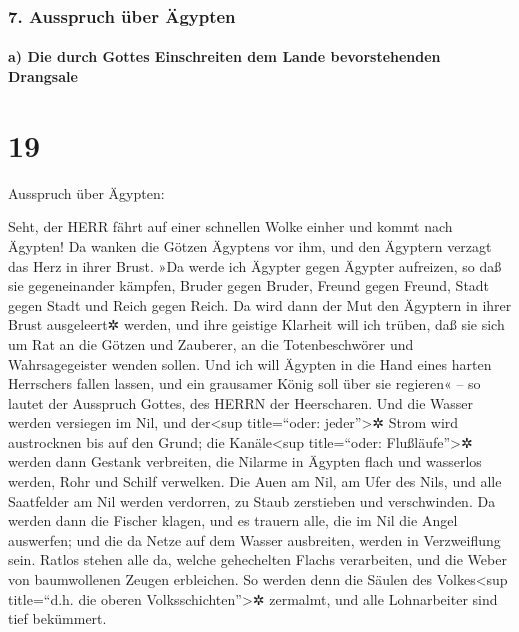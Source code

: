 \hypertarget{ausspruch-uxfcber-uxe4gypten}{%
\subsubsection{7. Ausspruch über
Ägypten}\label{ausspruch-uxfcber-uxe4gypten}}

\hypertarget{a-die-durch-gottes-einschreiten-dem-lande-bevorstehenden-drangsale}{%
\paragraph{a) Die durch Gottes Einschreiten dem Lande bevorstehenden
Drangsale}\label{a-die-durch-gottes-einschreiten-dem-lande-bevorstehenden-drangsale}}

\hypertarget{section-18}{%
\section{19}\label{section-18}}

Ausspruch über Ägypten:

Seht, der HERR fährt auf einer schnellen Wolke einher und kommt nach
Ägypten! Da wanken die Götzen Ägyptens vor ihm, und den Ägyptern verzagt
das Herz in ihrer Brust. »Da werde ich Ägypter gegen
Ägypter aufreizen, so daß sie gegeneinander kämpfen, Bruder gegen
Bruder, Freund gegen Freund, Stadt gegen Stadt und Reich gegen Reich.
Da wird dann der Mut den Ägyptern in ihrer Brust
ausgeleert✲ werden, und ihre geistige Klarheit will ich trüben, daß sie
sich um Rat an die Götzen und Zauberer, an die Totenbeschwörer und
Wahrsagegeister wenden sollen. Und ich will Ägypten in die
Hand eines harten Herrschers fallen lassen, und ein grausamer König soll
über sie regieren« -- so lautet der Ausspruch Gottes, des HERRN der
Heerscharen. Und die Wasser werden versiegen im Nil, und
der\textless sup title=``oder: jeder''\textgreater✲ Strom wird
austrocknen bis auf den Grund; die Kanäle\textless sup
title=``oder: Flußläufe''\textgreater✲ werden dann Gestank verbreiten,
die Nilarme in Ägypten flach und wasserlos werden, Rohr und Schilf
verwelken. Die Auen am Nil, am Ufer des Nils, und alle
Saatfelder am Nil werden verdorren, zu Staub zerstieben und
verschwinden. Da werden dann die Fischer klagen, und es
trauern alle, die im Nil die Angel auswerfen; und die da Netze auf dem
Wasser ausbreiten, werden in Verzweiflung sein. Ratlos
stehen alle da, welche gehechelten Flachs verarbeiten, und die Weber von
baumwollenen Zeugen erbleichen. So werden denn die Säulen
des Volkes\textless sup title=``d.h. die oberen
Volksschichten''\textgreater✲ zermalmt, und alle Lohnarbeiter sind tief
bekümmert.

